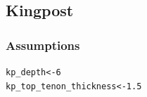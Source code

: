 \documentclass{article}\usepackage[]{graphicx}\usepackage[]{xcolor}
\makeatletter
\newcommand{\hlnum}[1]{\textcolor[rgb]{0.686,0.059,0.569}{#1}}%
\newcommand{\hlstd}[1]{\textcolor[rgb]{0.345,0.345,0.345}{#1}}%
\newcommand{\hlkwb}[1]{\textcolor[rgb]{0.69,0.353,0.396}{#1}}%
\newenvironment{kframe}{%
 \def\at@end@of@kframe{}%
 \ifinner\ifhmode%
  \def\at@end@of@kframe{\end{minipage}}%
  \begin{minipage}{\columnwidth}%
 \fi\fi%
 \def\FrameCommand##1{\hskip\@totalleftmargin \hskip-\fboxsep
 \colorbox{shadecolor}{##1}\hskip-\fboxsep
     \hskip-\linewidth \hskip-\@totalleftmargin \hskip\columnwidth}%
 \MakeFramed {\advance\hsize-\width
   \@totalleftmargin\z@ \linewidth\hsize
   \@setminipage}}%
 {\par\unskip\endMakeFramed%
 \at@end@of@kframe}
\newenvironment{knitrout}{}{} %
\makeatother
\begin{document}
\newpage

\subsection{Kingpost}\label{kp-layout-and-cuts}
\subsubsection{Assumptions}
\begin{knitrout}
\color{fgcolor}\begin{kframe}
\begin{alltt}
\hlstd{kp_depth} \hlkwb{<-} \hlnum{6}
\hlstd{kp_top_tenon_thickness} \hlkwb{<-} \hlnum{1.5}
\end{alltt}
\end{kframe}
\end{knitrout}

% 
% 
\end{document}
